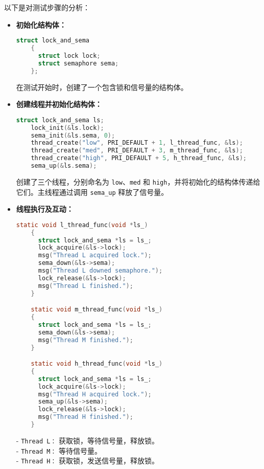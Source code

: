 \documentclass{beamer}
\begin{document}
\begin{frame}


  \framebreak

  以下是对测试步骤的分析：

  \begin{itemize}
    \item \textbf{初始化结构体：}
          \begin{lstlisting}[language=C]
    struct lock_and_sema 
    {
      struct lock lock;
      struct semaphore sema;
    };
\end{lstlisting}
          在测试开始时，创建了一个包含锁和信号量的结构体。

    \item \textbf{创建线程并初始化结构体：}
          \begin{lstlisting}[language=C]
    struct lock_and_sema ls;
    lock_init(&ls.lock);
    sema_init(&ls.sema, 0);
    thread_create("low", PRI_DEFAULT + 1, l_thread_func, &ls);
    thread_create("med", PRI_DEFAULT + 3, m_thread_func, &ls);
    thread_create("high", PRI_DEFAULT + 5, h_thread_func, &ls);
    sema_up(&ls.sema);
\end{lstlisting}
          创建了三个线程，分别命名为 \texttt{low}、\texttt{med} 和 \texttt{high}，并将初始化的结构体传递给它们。主线程通过调用 \texttt{sema\_up} 释放了信号量。

    \item \textbf{线程执行及互动：}
          \begin{lstlisting}[language=C]
    static void l_thread_func(void *ls_) 
    {
      struct lock_and_sema *ls = ls_;
      lock_acquire(&ls->lock);
      msg("Thread L acquired lock.");
      sema_down(&ls->sema);
      msg("Thread L downed semaphore.");
      lock_release(&ls->lock);
      msg("Thread L finished.");
    }

    static void m_thread_func(void *ls_) 
    {
      struct lock_and_sema *ls = ls_;
      sema_down(&ls->sema);
      msg("Thread M finished.");
    }

    static void h_thread_func(void *ls_) 
    {
      struct lock_and_sema *ls = ls_;
      lock_acquire(&ls->lock);
      msg("Thread H acquired lock.");
      sema_up(&ls->sema);
      lock_release(&ls->lock);
      msg("Thread H finished.");
    }
\end{lstlisting}
          - \texttt{Thread L：} 获取锁，等待信号量，释放锁。 \\
          - \texttt{Thread M：} 等待信号量。 \\
          - \texttt{Thread H：} 获取锁，发送信号量，释放锁。


\end{itemize}
\end{frame}
\end{document}
